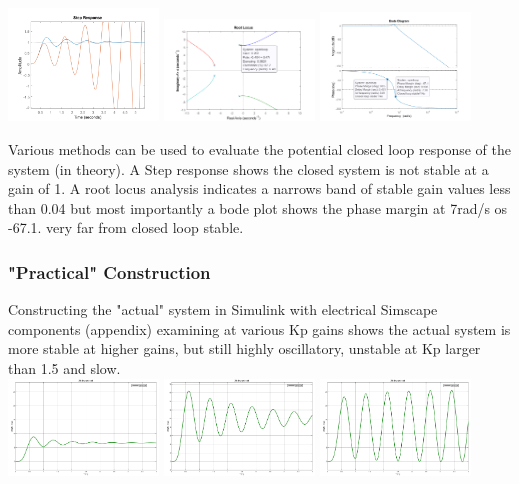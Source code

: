 \documentclass[a4paper,11pt]{article}
\begin{document}
\includegraphics[width=0.3\textwidth]{inc/theory_step.png}
\includegraphics[width=0.3\textwidth]{inc/theory_rlocus.png}
\includegraphics[width=0.3\textwidth]{inc/theory_bode.png}

Various methods can be used to evaluate the potential closed loop response of the system (in theory). A Step response shows the closed system is not stable at a gain of 1. A root locus analysis indicates a narrows band of stable gain values less than 0.04 but most importantly a bode plot shows the phase margin at 7rad/s os -67.1. very far from closed loop stable.


\subsubsection{"Practical" Construction}
Constructing the "actual" system in Simulink with electrical Simscape components (appendix) examining at various Kp gains shows the actual system is more stable at higher gains, but still highly oscillatory, unstable at Kp larger than 1.5 and slow. \\

\includegraphics[width=0.3\textwidth]{inc/closedKP05.png}
\includegraphics[width=0.3\textwidth]{inc/closedKP1.png}
\includegraphics[width=0.3\textwidth]{inc/closedKP15.png}
\end{document}
